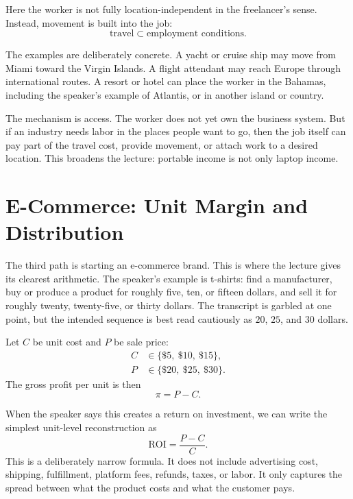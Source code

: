 Here the worker is not fully location-independent in the freelancer's sense. Instead, movement is built into the job:
\begin{equation}
\text{travel}
\subset
\text{employment conditions}.
\end{equation}

The examples are deliberately concrete. A yacht or cruise ship may move from Miami toward the Virgin Islands. A flight attendant may reach Europe through international routes. A resort or hotel can place the worker in the Bahamas, including the speaker's example of Atlantis, or in another island or country.

The mechanism is access. The worker does not yet own the business system. But if an industry needs labor in the places people want to go, then the job itself can pay part of the travel cost, provide movement, or attach work to a desired location. This broadens the lecture: portable income is not only laptop income.

\section{E-Commerce: Unit Margin and Distribution}

The third path is starting an e-commerce brand. This is where the lecture gives its clearest arithmetic. The speaker's example is t-shirts: find a manufacturer, buy or produce a product for roughly five, ten, or fifteen dollars, and sell it for roughly twenty, twenty-five, or thirty dollars. The transcript is garbled at one point, but the intended sequence is best read cautiously as \(20\), \(25\), and \(30\) dollars.

Let \(C\) be unit cost and \(P\) be sale price:
\begin{align}
C &\in \{\$5,\ \$10,\ \$15\},\\
P &\in \{\$20,\ \$25,\ \$30\}.
\end{align}
The gross profit per unit is then
\begin{equation}
\pi = P-C.
\end{equation}

When the speaker says this creates a return on investment, we can write the simplest unit-level reconstruction as
\begin{equation}
\mathrm{ROI}=\frac{P-C}{C}.
\end{equation}
This is a deliberately narrow formula. It does not include advertising cost, shipping, fulfillment, platform fees, refunds, taxes, or labor. It only captures the spread between what the product costs and what the customer pays.

